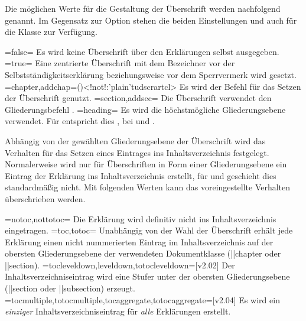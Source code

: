 \begin{DeclareEntity*}{}
\begin{DeclareEntity*}{}
\begin{DeclareEntity*}{}
\begin{Declaration}
Die möglichen Werte für die Gestaltung der Überschrift werden nachfolgend 
genannt. Im Gegensatz zur Option  stehen die beiden 
Einstellungen  und  auch für 
die Klasse  zur Verfügung.
\begin{DeclareValues}
\itemval=false=
  Es wird keine Überschrift über den Erklärungen selbst ausgegeben.
\itemval*=true=
  Eine zentrierte Überschrift mit dem Bezeichner  vor 
  der Selbstständigkeitserklärung beziehungsweise  vor dem 
  Sperrvermerk wird gesetzt. 
\itemval=chapter,addchap=()<!not!:\Class'plain'{tudscrartcl}>
  Es wird der Befehl  für das Setzen der Überschrift genutzt. 
\itemval=section,addsec=
  Die Überschrift verwendet den Gliederungsbefehl .
\itemval=heading=
  Es wird die höchstmögliche Gliederungsebene verwendet. Für 
   entspricht dies , bei 
   und  .
\end{DeclareValues}

Abhängig von der gewählten Gliederungsebene der Überschrift wird das Verhalten 
für das Setzen eines Eintrages ins Inhaltsverzeichnis festgelegt. Normalerweise 
wird nur für Überschriften in Form einer Gliederungsebene ein Eintrag der 
Erklärung ins Inhaltsverzeichnis erstellt, für  und 
 geschieht dies standardmäßig nicht. Mit folgenden 
Werten kann das voreingestellte Verhalten überschrieben werden.
\begin{DeclareValues}
\itemval=notoc,nottotoc=
  Die Erklärung wird definitiv nicht ins Inhaltsverzeichnis eingetragen.
\itemval=toc,totoc=
  Unabhängig von der Wahl der Überschrift erhält jede Erklärung einen nicht
  nummerierten Eintrag im Inhaltsverzeichnis auf der obersten Gliederungsebene 
  der verwendeten Dokumentklasse (\Macro||{chapter} oder \Macro||{section}). 
\itemval=tocleveldown,leveldown,totocleveldown=[v2.02]
  Der Inhaltsverzeichniseintrag wird eine Stufer unter der obersten 
  Gliederungsebene (\Macro||{section} oder \Macro||{subsection}) erzeugt.
\itemval=tocmultiple,totocmultiple,tocaggregate,totocaggregate=[v2.04]
  Es wird ein \emph{einziger} Inhaltsverzeichniseintrag für \emph{alle} 
  Erklärungen erstellt.
\end{DeclareValues}


\end{Declaration}
\end{DeclareEntity*}
\end{DeclareEntity*}
\end{DeclareEntity*}
